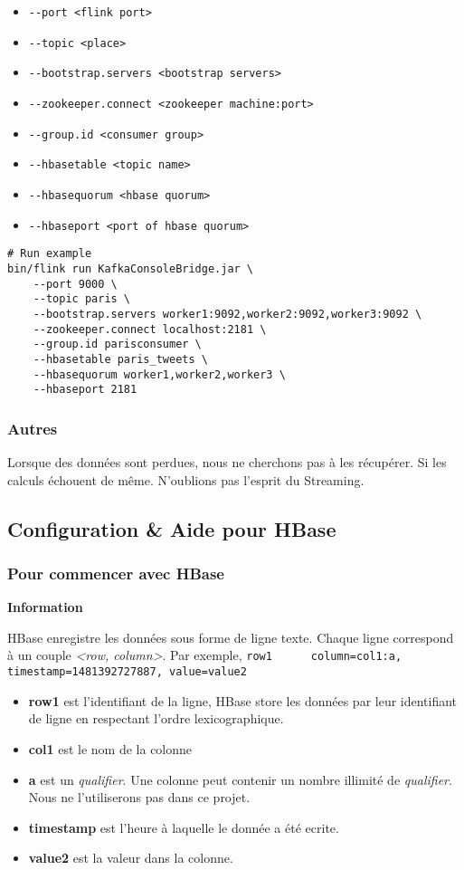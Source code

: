 \documentclass[a4paper,oneside,11pt]{article}
\begin{document}
\begin{itemize}
\item \verb!--port <flink port>! 
\item \verb!--topic <place>!
\item \verb!--bootstrap.servers <bootstrap servers>!
\item \verb!--zookeeper.connect <zookeeper machine:port>!
\item \verb!--group.id <consumer group>!
\item \verb!--hbasetable <topic name>!
\item \verb!--hbasequorum <hbase quorum>!
\item \verb!--hbaseport <port of hbase quorum>!
\end{itemize}

\begin{verbatim}
# Run example
bin/flink run KafkaConsoleBridge.jar \
	--port 9000 \
	--topic paris \
	--bootstrap.servers worker1:9092,worker2:9092,worker3:9092 \
	--zookeeper.connect localhost:2181 \
	--group.id parisconsumer \
	--hbasetable paris_tweets \
	--hbasequorum worker1,worker2,worker3 \
	--hbaseport 2181
\end{verbatim}

\subsubsection{Autres}

Lorsque des données sont perdues, nous ne cherchons pas à les récupérer. Si les calculs échouent de même. N'oublions pas l'esprit du Streaming. 

\subsection{Configuration \& Aide pour HBase}


\subsubsection{Pour commencer avec HBase}

\textbf{Information}

HBase enregistre les données sous forme de ligne texte. Chaque ligne correspond à un couple \textit{<row, column>}. 
Par exemple, 
\verb!row1      column=col1:a, timestamp=1481392727887, value=value2!

\begin{itemize}
\item \textbf{row1} est l'identifiant de la ligne, HBase store les données par leur identifiant de ligne en respectant l'ordre lexicographique. 
\item \textbf{col1} est le nom de la colonne
\item \textbf{a} est un \textit{qualifier}. Une colonne peut contenir un nombre illimité de \textit{qualifier}. Nous ne l'utiliserons pas dans ce projet. 
\item \textbf{timestamp} est l'heure à laquelle le donnée a été ecrite. 
\item \textbf{value2} est la valeur dans la colonne. 
\end{itemize}
\end{document}
